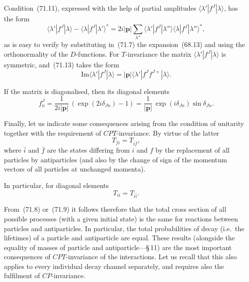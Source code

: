 Condition~(71.11), expressed with the help of partial amplitudes $\langle\lambda'|f^J|\lambda\rangle$, has the form
\begin{equation}
\langle\lambda'|f^J|\lambda\rangle - \langle\lambda|f^J|\lambda'\rangle^* = 2i|\mathbf{p}|\sum_{\lambda''}\langle\lambda'|f^J|\lambda''\rangle\langle\lambda|f^J|\lambda''\rangle^*,
\tag{71.13}
\end{equation}
as is easy to verify by substituting in~(71.7) the expansion~(68.13) and using the orthonormality of the $D$-functions. For $T$-invariance the matrix $\langle\lambda'|f^J|\lambda\rangle$ is symmetric, and~(71.13) takes the form
\begin{equation}
\mathrm{Im}\langle\lambda'|f^J|\lambda\rangle = |\mathbf{p}|\langle\lambda'|f^J f^{J+}|\lambda\rangle.
\tag{71.14}
\end{equation}

If the matrix is diagonalised, then its diagonal elements
\begin{equation}
f^J_n = \frac{1}{2i|\mathbf{p}|}\,(\exp(2i\delta_{Jn}) - 1) = \frac{1}{|\mathbf{p}|}\,\exp(i\delta_{Jn})\sin\delta_{Jn}.
\tag{71.15}
\end{equation}

Finally, let us indicate some consequences arising from the condition of unitarity together with the requirement of $CPT$-invariance. By virtue of the latter
\begin{equation}
T_{fi} = T_{\bar{i}\bar{f}},
\tag{71.16}
\end{equation}
where $\bar{i}$ and $\bar{f}$ are the states differing from $i$ and $f$ by the replacement of all particles by antiparticles (and also by the change of sign of the momentum vectors of all particles at unchanged momenta).

In particular, for diagonal elements
\[
T_{ii} = T_{\bar{i}\bar{i}}.
\]

From~(71.8) or~(71.9) it follows therefore that the total cross section of all possible processes (with a given initial state) is the same for reactions between particles and antiparticles. In particular, the total probabilities of decay (i.e.\ the lifetimes) of a particle and antiparticle are equal. These results (alongside the equality of masses of particle and antiparticle---\S\,11) are the most important consequences of $CPT$-invariance of the interactions. Let us recall that this also applies to every individual decay channel separately, and requires also the fulfilment of $CP$-invariance.

